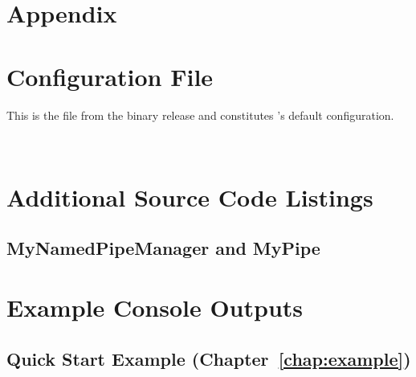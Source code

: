 % 


\appendix

\chapter*{Appendix}

  \chapter{\KiekerMonitoringPart{} Configuration File}\label{sec:appdx:monitoringproperties}

This is the file \file{\monitoringPropertiesFile} from the binary release and 
constitutes \KiekerMonitoringPart{}'s default configuration.

\

\setXMLListing


\chapter{Additional Source Code Listings}
\section{MyNamedPipeManager and MyPipe}\label{appendix:pipeListings}
      \setJavaCodeListing
      
\newpage
      \setJavaCodeListing
      

\chapter{Example Console Outputs}

\section{Quick Start Example (Chapter~\ref{chap:example})}\label{sec:appendix:manualInstrumentation:output}

\newpage

\newpage	
